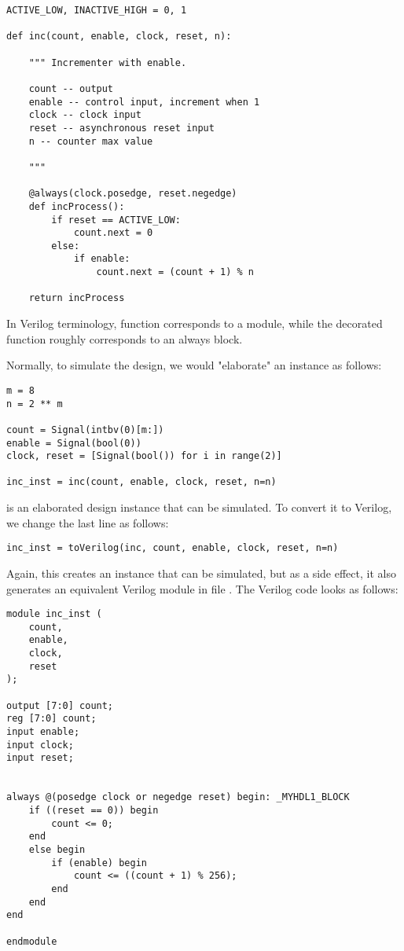 \begin{verbatim}
ACTIVE_LOW, INACTIVE_HIGH = 0, 1

def inc(count, enable, clock, reset, n):
    
    """ Incrementer with enable.
    
    count -- output
    enable -- control input, increment when 1
    clock -- clock input
    reset -- asynchronous reset input
    n -- counter max value
    
    """
    
    @always(clock.posedge, reset.negedge)
    def incProcess():
        if reset == ACTIVE_LOW:
            count.next = 0
        else:
            if enable:
                count.next = (count + 1) % n
                
    return incProcess
\end{verbatim}

In Verilog terminology, function  corresponds to a
module, while the decorated function 
roughly corresponds to an always block.

Normally, to simulate the design, we would "elaborate" an instance
as follows:

\begin{verbatim}
m = 8
n = 2 ** m
 
count = Signal(intbv(0)[m:])
enable = Signal(bool(0))
clock, reset = [Signal(bool()) for i in range(2)]

inc_inst = inc(count, enable, clock, reset, n=n)
\end{verbatim}

 is an elaborated design instance that can be simulated. To
convert it to Verilog, we change the last line as follows:

\begin{verbatim}
inc_inst = toVerilog(inc, count, enable, clock, reset, n=n)
\end{verbatim}

Again, this creates an instance that can be simulated, but as a side
effect, it also generates an equivalent Verilog module in file .
The Verilog code looks as follows:

\begin{verbatim}
module inc_inst (
    count,
    enable,
    clock,
    reset
);

output [7:0] count;
reg [7:0] count;
input enable;
input clock;
input reset;


always @(posedge clock or negedge reset) begin: _MYHDL1_BLOCK
    if ((reset == 0)) begin
        count <= 0;
    end
    else begin
        if (enable) begin
            count <= ((count + 1) % 256);
        end
    end
end

endmodule
\end{verbatim}

